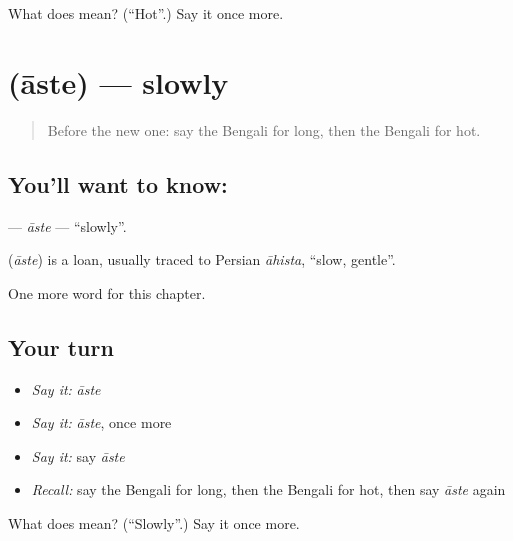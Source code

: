 \begin{tcolorbox}[breakable,colback=teal!4,colframe=teal!35!black,title={Before you move on}]
What does  mean? (\textquotedblleft{}Hot\textquotedblright{}.) Say it once more.
\end{tcolorbox}
\section[\texorpdfstring{\bn{আস্তে} (āste)}{আস্তে (āste)}]{ (āste) — slowly}

\label{lesson:BN-C73-aste}



\begin{quote}
Before the new one: say the Bengali for long, then the Bengali for hot.
\end{quote}

\subsection*{You'll want to know: }
\textbf{} — \emph{āste} — \textquotedblleft{}slowly\textquotedblright{}.

\begin{cousinweb}
\textbf{} (\emph{āste}) is a loan, usually traced to Persian \emph{āhista}, \textquotedblleft{}slow, gentle\textquotedblright{}.
\end{cousinweb}

\begin{grammarlens}[title={What you've built}]
One more word for this chapter.
\end{grammarlens}

\subsection*{Your turn}
\begin{itemize}
\raggedright
  \item \emph{Say it:} \emph{āste}
  \item \emph{Say it:} \emph{āste}, once more
  \item \emph{Say it:} say \emph{āste}
  \item \emph{Recall:} say the Bengali for long, then the Bengali for hot, then say \emph{āste} again
\end{itemize}

\begin{tcolorbox}[breakable,colback=teal!4,colframe=teal!35!black,title={Before you move on}]
What does  mean? (\textquotedblleft{}Slowly\textquotedblright{}.) Say it once more.
\end{tcolorbox}

